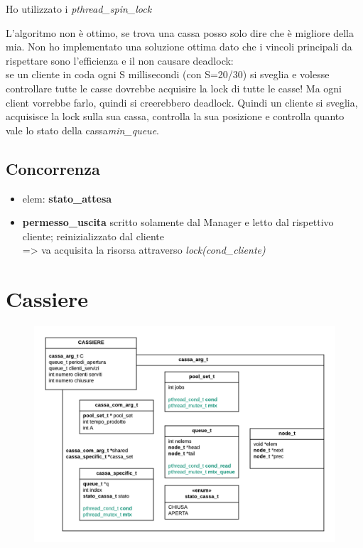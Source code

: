 \documentclass[11pt, a4paper]{article}
\begin{document}
Ho utilizzato i \textit{pthread\_spin\_lock}

L'algoritmo non è ottimo, se trova una cassa posso solo dire che è migliore della mia. Non ho implementato una soluzione ottima dato che i vincoli principali da rispettare sono l'efficienza e il non causare deadlock:\\
se un cliente in coda ogni S millisecondi (con S=20/30) si sveglia e volesse controllare tutte le casse dovrebbe acquisire la lock di tutte le casse! Ma ogni client vorrebbe farlo, quindi si creerebbero deadlock. 
Quindi un cliente si sveglia, acquisisce la lock sulla sua cassa, controlla la sua posizione e controlla quanto vale lo stato della cassa\textit{min\_queue}. 
\subsection{Concorrenza}
\begin{itemize}
\item elem: \textbf{stato\_attesa}
\item \textbf{permesso\_uscita} scritto solamente dal Manager e letto dal rispettivo cliente; reinizializzato dal cliente\\
=> \hspace{10mm} va acquisita la risorsa attraverso \textit{lock(cond\_cliente)} 

\end{itemize}


\section{Cassiere}

\begin{figure}[h]
	\centering
	\includegraphics[scale=0.8]{cassa.png}
	\label{fig:cassa}
\end{figure}
\end{document}
